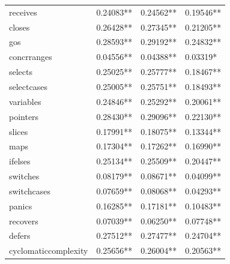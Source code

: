 \documentclass{seal_thesis}
\begin{document}
\begin{table}[H]
\begin{tabular}{@{}llll@{}}
		receives & \cellcolor[HTML]{C0C0C0}0.24083** & \cellcolor[HTML]{C0C0C0}0.24562** & \cellcolor[HTML]{99CCFF}0.19546** \\
		closes & \cellcolor[HTML]{FFCC99}0.26428** & \cellcolor[HTML]{FFCC99}0.27345** & \cellcolor[HTML]{99CCFF}0.21205** \\
		gos & \cellcolor[HTML]{FFCC99}0.28593** & \cellcolor[HTML]{FFCC99}0.29192** & \cellcolor[HTML]{C0C0C0}0.24832** \\
		concrranges & \cellcolor[HTML]{3366FF}0.04556** & \cellcolor[HTML]{3366FF}0.04388** & \cellcolor[HTML]{3366FF}0.03319* \\
		selects & \cellcolor[HTML]{C0C0C0}0.25025** & \cellcolor[HTML]{FFCC99}0.25777** & \cellcolor[HTML]{99CCFF}0.18467** \\
		selectcases & \cellcolor[HTML]{C0C0C0}0.25005** & \cellcolor[HTML]{FFCC99}0.25751** & \cellcolor[HTML]{99CCFF}0.18493** \\
		variables & \cellcolor[HTML]{C0C0C0}0.24846** & \cellcolor[HTML]{C0C0C0}0.25292** & \cellcolor[HTML]{99CCFF}0.20061** \\
		pointers & \cellcolor[HTML]{FFCC99}0.28430** & \cellcolor[HTML]{FFCC99}0.29096** & \cellcolor[HTML]{C0C0C0}0.22130** \\
		slices & \cellcolor[HTML]{99CCFF}0.17991** & \cellcolor[HTML]{99CCFF}0.18075** & \cellcolor[HTML]{99CCFF}0.13344** \\
		maps & \cellcolor[HTML]{99CCFF}0.17304** & \cellcolor[HTML]{99CCFF}0.17262** & \cellcolor[HTML]{99CCFF}0.16990** \\
		ifelses & \cellcolor[HTML]{C0C0C0}0.25134** & \cellcolor[HTML]{FFCC99}0.25509** & \cellcolor[HTML]{99CCFF}0.20447** \\
		switches & \cellcolor[HTML]{99CCFF}0.08179** & \cellcolor[HTML]{99CCFF}0.08671** & \cellcolor[HTML]{3366FF}0.04099** \\
		switchcases & \cellcolor[HTML]{99CCFF}0.07659** & \cellcolor[HTML]{99CCFF}0.08068** & \cellcolor[HTML]{3366FF}0.04293** \\
		panics & \cellcolor[HTML]{99CCFF}0.16285** & \cellcolor[HTML]{99CCFF}0.17181** & \cellcolor[HTML]{99CCFF}0.10483** \\
		recovers & \cellcolor[HTML]{3366FF}0.07039** & \cellcolor[HTML]{3366FF}0.06250** & \cellcolor[HTML]{99CCFF}0.07748** \\
		defers & \cellcolor[HTML]{FFCC99}0.27512** & \cellcolor[HTML]{FFCC99}0.27477** & \cellcolor[HTML]{C0C0C0}0.24704** \\
		cyclomaticcomplexity & \cellcolor[HTML]{FFCC99}0.25656** & \cellcolor[HTML]{FFCC99}0.26004** & \cellcolor[HTML]{99CCFF}0.20563** \\
		\bottomrule
	\end{tabular}
\end{table}
\end{document}

